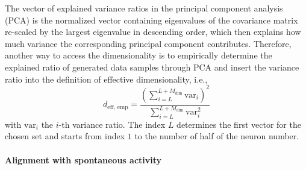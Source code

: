 \documentclass[11pt]{article}
\begin{document}
	The vector of explained variance ratios in the principal component analysis (PCA) is the normalized vector containing eigenvalues of the covariance matrix re-scaled by the largest eigenvalue in descending order, which then explains how much variance the corresponding principal component contributes. Therefore, another way to access the dimensionality is to empirically determine the explained ratio of generated data samples through PCA and insert the variance ratio into the definition of effective dimensionality, i.e.,
		\begin{equation} \label{eq:dim_empirical_sym}
			d_{\text{eff, emp}} = \frac{\left(\sum_{i=L}^{L+M_{\text{dim}}}\text{var}_i\right)^2}{\sum_{i=L}^{L+M_{\text{dim}}}\text{var}_i^2} 
		\end{equation}
	with $\text{var}_i$ the $i$-th variance ratio. The index $L$ determines the first vector for the chosen set and starts from index $1$ to the number of half of the neuron number.
	
	\paragraph{Alignment with spontaneous activity}
	
\end{document}

